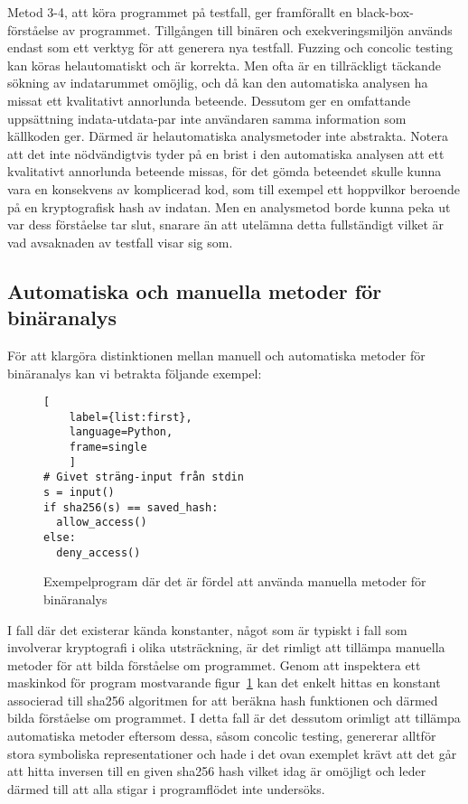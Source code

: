 Metod 3-4, att köra programmet på testfall, ger framförallt en
black-box-förståelse av programmet. Tillgången till binären och
exekveringsmiljön används endast som ett verktyg för att generera nya testfall.
Fuzzing och concolic testing kan köras helautomatiskt och är korrekta.
Men ofta är en tillräckligt täckande sökning av indatarummet omöjlig, och då kan
den automatiska analysen ha missat ett kvalitativt annorlunda beteende. Dessutom
ger en omfattande uppsättning indata-utdata-par inte användaren samma
information som källkoden ger. Därmed är helautomatiska analysmetoder inte
abstrakta. Notera att det inte nödvändigtvis tyder på en brist i den
automatiska analysen att ett kvalitativt annorlunda beteende missas, för det
gömda beteendet skulle kunna vara en konsekvens av komplicerad kod, som till
exempel ett hoppvilkor beroende på en kryptografisk hash av indatan. Men en
analysmetod borde kunna peka ut var dess förståelse tar slut, snarare än att
utelämna detta fullständigt vilket är vad avsaknaden av testfall visar sig som.


\subsection{Automatiska och manuella metoder för binäranalys}
För att klargöra distinktionen mellan manuell och automatiska metoder för
binäranalys kan vi betrakta följande exempel:

\begin{figure}
    \begin{lstlisting}[
    label={list:first},
    language=Python,
    frame=single
    ]
# Givet sträng-input från stdin
s = input()
if sha256(s) == saved_hash:
  allow_access()
else:
  deny_access()
\end{lstlisting}
    \caption{Exempelprogram där det är fördel att använda manuella metoder för binäranalys}
    \label{fig:manual_method_example}
\end{figure}

I fall där det existerar kända konstanter, något som är typiskt i fall som
involverar kryptografi i olika utsträckning, är det rimligt att tillämpa
manuella metoder för att bilda förståelse om programmet. Genom att inspektera
ett maskinkod för program mostvarande figur~\ref{fig:manual_method_example} kan
det enkelt hittas en konstant associerad till sha256 algoritmen for att beräkna
hash funktionen och därmed bilda förståelse om programmet. I detta fall är det
dessutom orimligt att tillämpa automatiska metoder eftersom dessa, såsom
concolic testing, genererar alltför stora symboliska representationer och hade
i det ovan exemplet krävt att det går att hitta inversen till en given sha256
hash vilket idag är omöjligt och leder därmed till att alla stigar i
programflödet inte undersöks.

